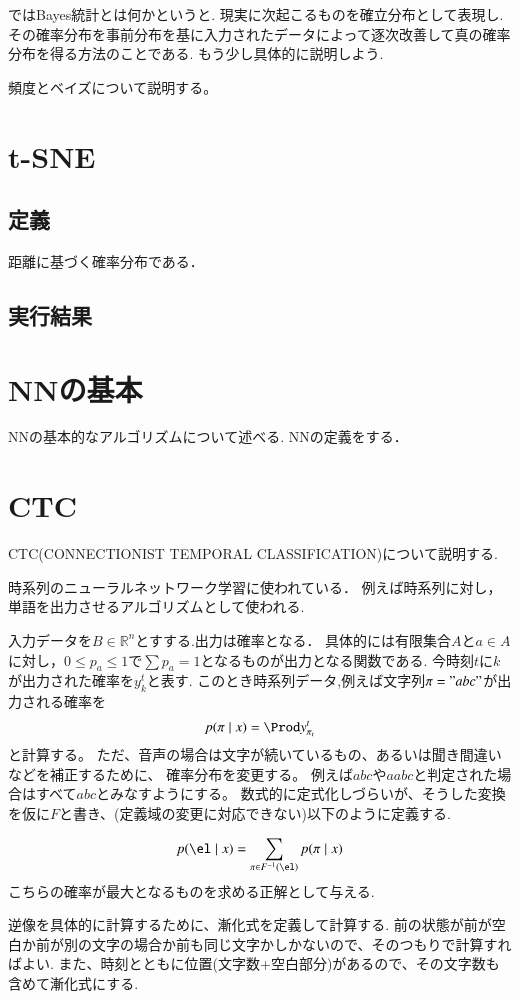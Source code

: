 \documentclass{ujarticle}
\begin{document}
ではBayes統計とは何かというと.
現実に次起こるものを確立分布として表現し.
その確率分布を事前分布を基に入力されたデータによって逐次改善して真の確率分布を得る方法のことである.
もう少し具体的に説明しよう.


頻度とベイズについて説明する。

\section{t-SNE}
\label{sec:t-SNE}
\subsection{定義}
\label{sub:定義}
距離に基づく確率分布である．

\subsection{実行結果}
\label{sub:実行結果}

\section{NNの基本}
\label{sec:NNの基本}

NNの基本的なアルゴリズムについて述べる.
NNの定義をする．


\section{CTC}
\label{sec:CTC}
CTC(CONNECTIONIST TEMPORAL CLASSIFICATION)について説明する.

時系列のニューラルネットワーク学習に使われている．
例えば時系列に対し，単語を出力させるアルゴリズムとして使われる.

入力データを$B \in \mathbb{R}^n$とすする.出力は確率となる．
具体的には有限集合$A$と$a \in A$に対し，$0 \le p_a \le 1$で$\sum p_a =1$となるものが出力となる関数である.
今時刻$t$に$k$が出力された確率を$y_k^t$と表す.
このとき時系列データ,例えば文字列$\pi="abc"$が出力される確率を
\begin{equation*}
 p(\pi \mid x ) = \Prod y_{\pi_t}^t
\end{equation*}
と計算する。
ただ、音声の場合は文字が続いているもの、あるいは聞き間違いなどを補正するために、
確率分布を変更する。
例えば$abc $や$aabc$と判定された場合はすべて$abc$とみなすようにする。
数式的に定式化しづらいが、そうした変換を仮に$F$と書き、(定義域の変更に対応できない)以下のように定義する.

\begin{equation*}
  p( \el \mid x) = \sum_{ \pi \in F^{-1}(\el)} p(\pi \mid x )
\end{equation*}
こちらの確率が最大となるものを求める正解として与える.

逆像を具体的に計算するために、漸化式を定義して計算する.
前の状態が前が空白か前が別の文字の場合か前も同じ文字かしかないので、そのつもりで計算すればよい.
また、時刻とともに位置(文字数+空白部分)があるので、その文字数も含めて漸化式にする.
\end{document}
